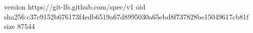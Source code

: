 version https://git-lfs.github.com/spec/v1
oid sha256:c37c9152b676173f4edb6519a67d8995030a65ebd8f737828be15049617cb81f
size 87544
